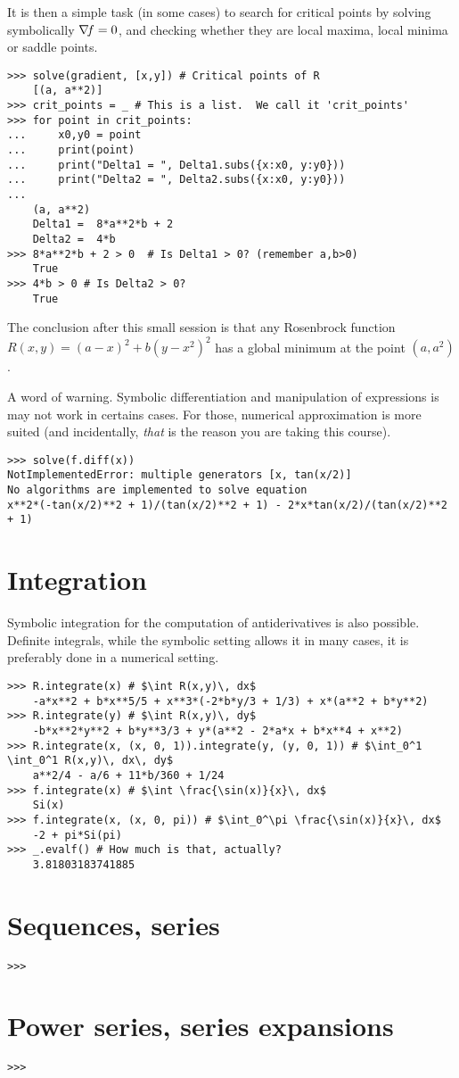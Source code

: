 It is then a simple task (in some cases) to search for critical points by solving symbolically $\mathop{\nabla\! {f}}=0$, and checking whether they are local maxima, local minima or saddle points.
\begin{verbatim}
>>> solve(gradient, [x,y]) # Critical points of R
	[(a, a**2)]
>>> crit_points = _ # This is a list.  We call it 'crit_points' 
>>> for point in crit_points:
...     x0,y0 = point
...     print(point)
...     print("Delta1 = ", Delta1.subs({x:x0, y:y0}))
...     print("Delta2 = ", Delta2.subs({x:x0, y:y0}))
...
	(a, a**2)
	Delta1 =  8*a**2*b + 2
	Delta2 =  4*b
>>> 8*a**2*b + 2 > 0  # Is Delta1 > 0? (remember a,b>0)
	True
>>> 4*b > 0 # Is Delta2 > 0?
	True
\end{verbatim}
The conclusion after this small session is that any Rosenbrock function $R(x,y) = (a-x)^2 + b(y-x^2)^2$ has a global minimum at the point $(a,a^2)$.

A word of warning.  Symbolic differentiation and manipulation of expressions is may not work in certains cases.  For those, numerical approximation is more suited (and incidentally, \emph{that} is the reason you are taking this course).

\begin{verbatim}
>>> solve(f.diff(x))
NotImplementedError: multiple generators [x, tan(x/2)]
No algorithms are implemented to solve equation 
x**2*(-tan(x/2)**2 + 1)/(tan(x/2)**2 + 1) - 2*x*tan(x/2)/(tan(x/2)**2 + 1)
\end{verbatim}

\section{Integration}

Symbolic integration for the computation of antiderivatives is also possible.  Definite integrals, while the symbolic setting allows it in many cases, it is preferably done in a numerical setting.

\begin{verbatim}
>>> R.integrate(x) # $\int R(x,y)\, dx$
	-a*x**2 + b*x**5/5 + x**3*(-2*b*y/3 + 1/3) + x*(a**2 + b*y**2)
>>> R.integrate(y) # $\int R(x,y)\, dy$
	-b*x**2*y**2 + b*y**3/3 + y*(a**2 - 2*a*x + b*x**4 + x**2)
>>> R.integrate(x, (x, 0, 1)).integrate(y, (y, 0, 1)) # $\int_0^1 \int_0^1 R(x,y)\, dx\, dy$
	a**2/4 - a/6 + 11*b/360 + 1/24
>>> f.integrate(x) # $\int \frac{\sin(x)}{x}\, dx$
	Si(x)
>>> f.integrate(x, (x, 0, pi)) # $\int_0^\pi \frac{\sin(x)}{x}\, dx$
	-2 + pi*Si(pi)
>>> _.evalf() # How much is that, actually?
	3.81803183741885
\end{verbatim}

\section{Sequences, series}

\begin{verbatim}
>>> 
\end{verbatim}

\section{Power series, series expansions}
\begin{verbatim}
>>> 
\end{verbatim}